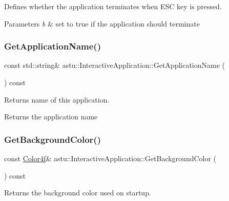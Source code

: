 Defines whether the application terminates when E\+SC key is pressed.


\begin{DoxyParams}{Parameters}
{\em b} & set to {\ttfamily true} if the application should terminate \\
\hline
\end{DoxyParams}
\mbox{\label{classastu_1_1InteractiveApplication_aad0d24125fde51bf80da87a77b58f0c2}} 
\subsubsection{\texorpdfstring{Get\+Application\+Name()}{GetApplicationName()}}
{\footnotesize\ttfamily const std\+::string\& astu\+::\+Interactive\+Application\+::\+Get\+Application\+Name (\begin{DoxyParamCaption}{ }\end{DoxyParamCaption}) const}

Returns name of this application.

\begin{DoxyReturn}{Returns}
the application name 
\end{DoxyReturn}
\mbox{\label{classastu_1_1InteractiveApplication_ad3d7a6635542108268e0ff7b8062fda8}} 
\subsubsection{\texorpdfstring{Get\+Background\+Color()}{GetBackgroundColor()}}
{\footnotesize\ttfamily const \hyperlink{classastu_1_1Color}{Color4f}\& astu\+::\+Interactive\+Application\+::\+Get\+Background\+Color (\begin{DoxyParamCaption}{ }\end{DoxyParamCaption}) const}

Returns the background color used on startup.

